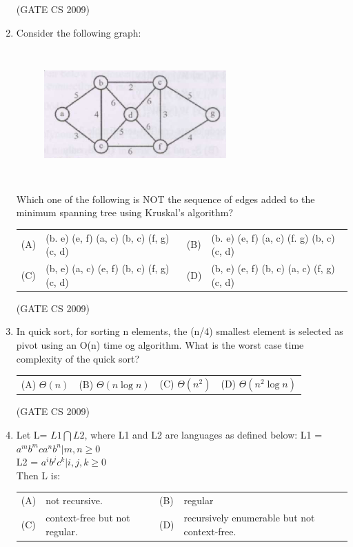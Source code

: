 \documentclass[a4paper, 11pt]{article}
\begin{document}
\begin{enumerate}
    \hfill (GATE CS 2009)

    \item Consider the following graph:\\

    \begin{figure}[H]
        \centering
        \includegraphics[width=7cm, height= 5cm]{figs/q38.png}
        \caption{}
        \label{fig:placeholder}
    \end{figure}
    Which one of the following is NOT the sequence of edges added to the minimum spanning tree using Kruskal's algorithm?\\
    \begin{tabularx}{\textwidth}{@{}lX lX@{}}
    (A) & (b. e) (e, f) (a, c) (b, c) (f, g) (c, d)  & (B) & (b. e) (e, f) (a, c) (f. g) (b, c) (c, d) \\
    (C) & (b, e) (a, c) (e, f) (b, c) (f, g) (c, d) & (D) & (b, e) (e, f) (b, c) (a, c) (f, g) (c, d)
    \end{tabularx}    

    \hfill (GATE CS 2009)

    \item In quick sort, for sorting n elements, the (n/4) smallest element is selected as pivot using an O(n) time og algorithm. What is the worst case time complexity of the quick sort?\\
    \begin{tabularx}{\textwidth}{@{}XXXX@{}}
       (A) \(\Theta(n)\)  & (B) \(\Theta(n \log n)\) & (C) \(\Theta(n^2)\) & (D) \(\Theta(n^2 \log n)\)  \\
    \end{tabularx}

    \hfill (GATE CS 2009)

    \item  Let L= $L1\bigcap L2$, where L1 and L2 are languages as defined below:
    L1 = {$a^m b^m c a^n b^n | m,n \geq0$}\\
    L2 = {$a^i b^j c^k| i,j,k \geq0$}\\
    Then L is:\\
    \begin{tabularx}{\textwidth}{@{}lX lX@{}}
    (A) & not recursive.  &  (B) &regular \\
    (C) & context-free but not regular. & (D)  &recursively enumerable but not context-free.
    \end{tabularx}   \\


\end{enumerate}
\end{document}
